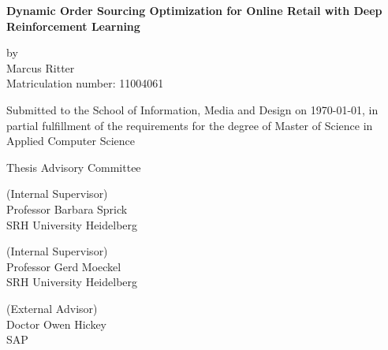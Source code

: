 \begin{titlepage}
\label{sec:detail_page}

\vspace{2em}
\begin{center}
\begin{LARGE}
\begin{onehalfspace}
\textbf{Dynamic Order Sourcing Optimization for Online Retail with Deep Reinforcement Learning}\\
\end{onehalfspace}
\end{LARGE}

\vspace{1em}
{\LARGE by}\\

\LARGE{Marcus Ritter}\\

\vspace{1em}
\large{Matriculation number: 11004061}\\

\vspace{4em}

\large{Submitted to the School of Information, Media and Design on \today, in partial fulfillment of the requirements for the degree of Master of Science in Applied Computer Science}\\

\end{center}

\vspace{8em}

\begin{flushleft}

\begin{large}
Thesis Advisory Committee
\end{large}

\vspace{3em}

\enspace\dotfill (Internal Supervisor)\\
Professor Barbara Sprick\\
SRH University Heidelberg\\

\vspace{2em}

\enspace\dotfill (Internal Supervisor)\\
Professor Gerd Moeckel\\
SRH University Heidelberg\\

\vspace{2em}

\enspace\dotfill (External Advisor)\\
Doctor Owen Hickey\\
SAP\\

\end{flushleft}

\vspace*{\fill}
\end{titlepage}